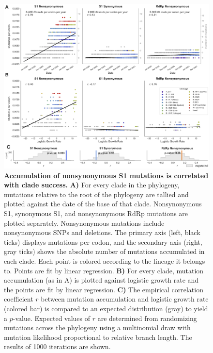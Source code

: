 \documentclass[11pt,oneside,letterpaper]{article}
\begin{document}
\begin{figure}[h!]
	\centerline{\includegraphics[width=1.0\textwidth]{fig1_mutaccumulation.png}}
	\caption{\textbf{Accumulation of nonsynonymous S1 mutations is correlated with clade success.}
	\textbf{A)} For every clade in the phylogeny, mutations relative to the root of the phylogeny are tallied and plotted against the date of the base of that clade. Nonsynonymous S1, synonymous S1, and nonsynonymous RdRp mutations are plotted separately.
	Nonsynonymous mutations include nonsynonymous SNPs and deletions.
	The primary axis (left, black ticks) displays mutations per codon, and the secondary axis (right, gray ticks) shows the absolute number of mutations accumulated in each clade.
	Each point is colored according to the lineage it belongs to.
	Points are fit by linear regression.
	\textbf{B)} For every clade, mutation accumulation (as in A) is plotted against logistic growth rate and the points are fit by linear regression.
	\textbf{C)} The empirical correlation coefficient $r$ between mutation accumulation and logistic growth rate (colored bar) is compared to an expected distribution (gray) to yield a $p$-value.
	Expected values of $r$ are determined from randomizing mutations across the phylogeny using a multinomial draw with mutation likelihood proportional to relative branch length.
	The results of 1000 iterations are shown.
	}
	\label{fig:mutaccumulation}
\end{figure}
\end{document}
